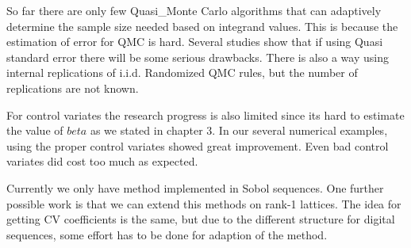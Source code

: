 
So far there are only few Quasi\_Monte Carlo algorithms that can adaptively determine the sample size needed based on integrand values. This is because the estimation of error for QMC is hard. Several studies show that if using Quasi standard error there will be some serious drawbacks\cite{owen2006warnock}. There is also a way using internal replications of i.i.d. Randomized QMC rules, but the number of replications are not known\cite{hickernell2005control}.

For control variates the research progress is also limited since its hard to estimate the value of $beta$ as we stated in chapter 3. 
In our several numerical examples, using the proper control variates showed great improvement. Even bad control variates did cost too much as expected.    


Currently we only have method implemented in Sobol sequences. One further possible work is that we can extend this methods on rank-1 lattices\cite{rugama2014adaptive}. The idea for getting CV coefficients is the same, but due to the different structure for digital sequences, some effort has to be done for adaption of the method. 

